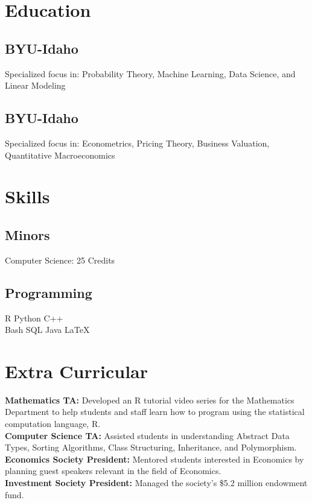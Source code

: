 \message{ !name(cv_12 copy.tex)}\documentclass[letterpaper]{deedy-resume}
\begin{document}
\begin{minipage}[t]{0.31\textwidth}
\section{Education} 

\subsection{BYU-Idaho}
\vspace{.02cm}
Specialized focus in:
Probability Theory, Machine Learning,
Data Science, and Linear Modeling
\sectionspace

\subsection{BYU-Idaho}
\vspace{.02cm}
Specialized focus in:
Econometrics, Pricing Theory,
Business Valuation, Quantitative Macroeconomics

\section{Skills}
\subsection{Minors}
\textbullet{} Computer Science: 25 Credits \\

\sectionspace

\subsection{Programming}
\textbullet{} R \textbullet{} Python \textbullet{} C++ \\
\textbullet{} Bash \textbullet{} SQL \textbullet{} Java \textbullet{} \LaTeX{} \\ 

\sectionspace

\section{Extra Curricular}
\textbf{Mathematics TA:} Developed an R tutorial video series for the
Mathematics Department to help students and staff learn
how to program using the statistical computation language, R.\\
\sectionspace
\textbf{Computer Science TA:} Assisted students in understanding
Abstract Data Types, Sorting Algorithms, Class Structuring,
Inheritance, and Polymorphism. \\
\sectionspace
\textbf{Economics Society President:} Mentored students
interested in Economics by planning guest speakers relevant in the
field of Economics.\\
\sectionspace
\textbf{Investment Society President:} Managed the
society's \$5.2 million endowment fund.\\



\end{minipage}
\end{document}
